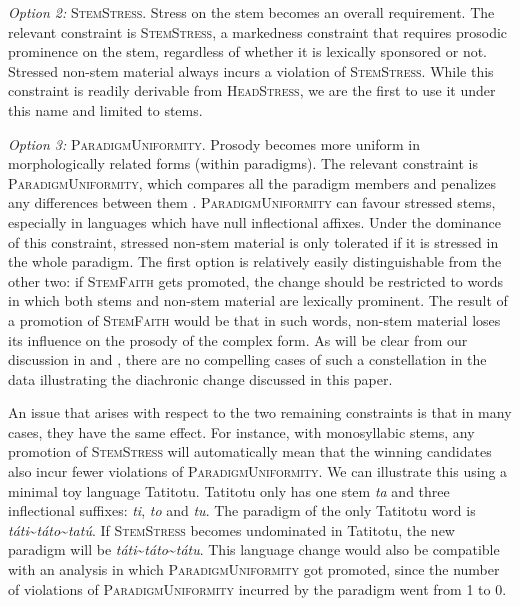 \documentclass[output=paper,modfonts,nonflat
]{langsci/langscibook}
\begin{document}
\textit{Option 2:} \textsc{StemStress}. Stress on the stem becomes an overall requirement. The relevant constraint is \textsc{StemStress}, a markedness constraint that requires prosodic prominence on the stem, regardless of whether it is lexically sponsored or not. Stressed non-stem material always incurs a violation of \textsc{StemStress}. While this constraint is readily derivable from  \textsc{HeadStress}, we are the first to use it under this name and limited to stems. 

\textit{Option 3:} \textsc{ParadigmUniformity}. Prosody becomes more uniform in morphologically related forms (within paradigms). The relevant constraint is  \textsc{ParadigmUniformity}, which compares all the paradigm members and penalizes any differences between them \citep{Burzio1996, Kenstowicz1996}. \textsc{ParadigmUniformity} can favour stressed stems, especially in languages which have null inflectional affixes. Under the dominance of this constraint, stressed non-stem material is only tolerated if it is stressed in the whole paradigm. 
The first option is relatively easily distinguishable from the other two: if \textsc{StemFaith} gets promoted, the change should be restricted to words in which both stems and non-stem material are lexically prominent. The result of a promotion of \textsc{StemFaith} would be that in such words, non-stem material loses its influence on the prosody of the complex form. As will be clear from our discussion in  and  , there are no compelling cases of such a constellation in the data illustrating the diachronic change discussed in this paper.

An issue that arises with respect to the two remaining constraints is that in many cases, they have the same effect. For instance, with monosyllabic stems, any promotion of \textsc{StemStress} will automatically mean that the winning candidates also incur fewer violations of \textsc{ParadigmUniformity}. We can illustrate this using a minimal toy language Tatitotu. Tatitotu only has one stem \textit{ta} and three inflectional suffixes: \textit{ti}, \textit{to} and \textit{tu}. The paradigm of the only Tatitotu word is \textit{táti}\textasciitilde{}\textit{táto}\textasciitilde{}\textit{tatú}. If \textsc{StemStress} becomes undominated in Tatitotu, the new paradigm will be \textit{táti}\textasciitilde{}\textit{táto}\textasciitilde{}\textit{tátu}. This language change would also be compatible with an analysis in which \textsc{ParadigmUniformity} got promoted, since the number of violations of \textsc{ParadigmUniformity} incurred by the paradigm went from 1 to 0. 
\end{document}
